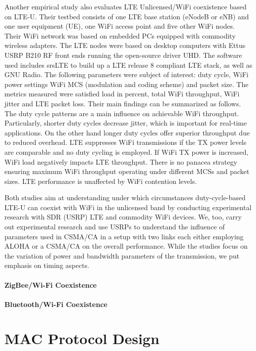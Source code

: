 Another empirical study \cite{capretti16} also evaluates LTE Unlicensed/WiFi coexistence based on LTE-U. Their testbed consists of one LTE base station (eNodeB or eNB) and one user equipment (UE), one WiFi access point and five other WiFi nodes. Their WiFi network was based on embedded PCs equipped with commodity wireless adapters. The LTE nodes were based on desktop computers with Ettus USRP B210 RF front ends running the open-source driver UHD. The software used includes srsLTE to build up a LTE release 8 compliant LTE stack, as well as GNU Radio. The following parameters were subject of interest: duty cycle, WiFi power settings WiFi MCS (modulation and coding scheme) and packet size. The metrics measured were satisfied load in percent, total WiFi throughput, WiFi jitter and LTE packet loss.  Their main findings can be summarized as follows. The duty cycle patterns are a main influence on achievable WiFi throughput. Particularly, shorter duty cycles decrease jitter, which is important for real-time applications. On the other hand longer duty cycles offer superior throughput due to reduced overhead. LTE suppresses WiFi transmissions if the TX power levels are comparable and no duty cycling is employed. If WiFi TX power is increased, WiFi load negatively impacts LTE throughput. There is no panacea strategy ensuring maximum WiFi throughput operating under different MCSs and packet sizes. LTE performance is unaffected by WiFi contention levels.

Both studies aim at understanding under which circumstances duty-cycle-based LTE-U can coexist with WiFi in the unlicensed band by conducting experimental research with SDR (USRP) LTE and commodity WiFi devices. We, too, carry out experimental research and use USRPs to understand the influence of parameters used in CSMA/CA in a setup with two links each either employing ALOHA or a CSMA/CA on the overall performance. While the studies focus on the variation of power and bandwidth parameters of the transmission, we put emphasis on timing aspects.   

\paragraph{ZigBee/Wi-Fi Coexistence}

\paragraph{Bluetooth/Wi-Fi Coexistence}

\section{MAC Protocol Design}

